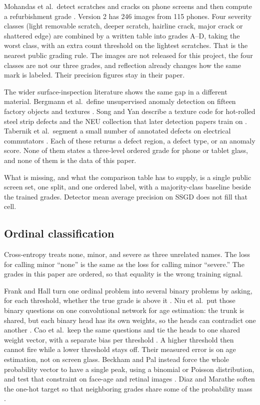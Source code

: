 \documentclass[10pt]{article}
\begin{document}
Mohandas et al.\ detect scratches and cracks on phone screens and then compute a refurbishment grade \cite{mohandas2025grading}. Version 2 has 246 images from 115 phones. Four severity classes (light removable scratch, deeper scratch, hairline crack, major crack or shattered edge) are combined by a written table into grades A--D, taking the worst class, with an extra count threshold on the lightest scratches. That is the nearest public grading rule. The images are not released for this project, the four classes are not our three grades, and reflection already changes how the same mark is labeled. Their precision figures stay in their paper.

The wider surface-inspection literature shows the same gap in a different material. Bergmann et al.\ define unsupervised anomaly detection on fifteen factory objects and textures \cite{bergmann2019mvtec}. Song and Yan describe a texture code for hot-rolled steel strip defects and the NEU collection that later detection papers train on \cite{song2013neu}. Tabernik et al.\ segment a small number of annotated defects on electrical commutators \cite{tabernik2020segmentation}. Each of these returns a defect region, a defect type, or an anomaly score. None of them states a three-level ordered grade for phone or tablet glass, and none of them is the data of this paper.

What is missing, and what the comparison table has to supply, is a single public screen set, one split, and one ordered label, with a majority-class baseline beside the trained grades. Detector mean average precision on SSGD does not fill that cell.

\subsection{Ordinal classification}
Cross-entropy treats none, minor, and severe as three unrelated names. The loss for calling minor ``none'' is the same as the loss for calling minor ``severe.'' The grades in this paper are ordered, so that equality is the wrong training signal.

Frank and Hall turn one ordinal problem into several binary problems by asking, for each threshold, whether the true grade is above it \cite{frank2001ordinal}. Niu et al.\ put those binary questions on one convolutional network for age estimation: the trunk is shared, but each binary head has its own weights, so the heads can contradict one another \cite{niu2016ordinal}. Cao et al.\ keep the same questions and tie the heads to one shared weight vector, with a separate bias per threshold \cite{cao2020coral}. A higher threshold then cannot fire while a lower threshold stays off. Their measured error is on age estimation, not on screen glass. Beckham and Pal instead force the whole probability vector to have a single peak, using a binomial or Poisson distribution, and test that constraint on face-age and retinal images \cite{beckham2017unimodal}. Diaz and Marathe soften the one-hot target so that neighboring grades share some of the probability mass \cite{diaz2019soft}.
\end{document}
